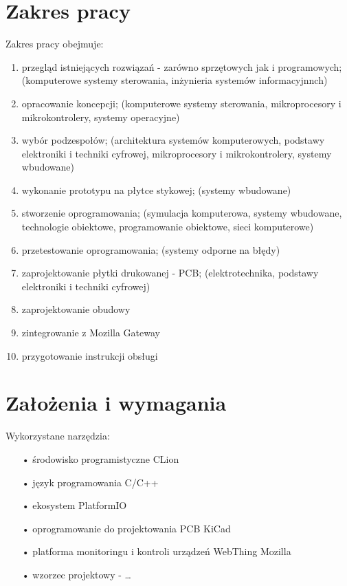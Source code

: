 \documentclass[12pt]{report}
\begin{document}
 \section{Zakres pracy}
 Zakres pracy obejmuje:
 \begin{enumerate}
 \item przegląd istniejących rozwiązań - zarówno sprzętowych jak i programowych; (komputerowe systemy sterowania, inżynieria systemów informacyjnnch)
 \item opracowanie koncepcji; (komputerowe systemy sterowania, mikroprocesory i mikrokontrolery, systemy operacyjne)
 \item wybór podzespołów; (architektura systemów komputerowych, podstawy elektroniki i techniki cyfrowej, mikroprocesory i mikrokontrolery, systemy wbudowane)
 \item wykonanie prototypu na płytce stykowej; (systemy wbudowane)
 \item stworzenie oprogramowania; (symulacja komputerowa, systemy wbudowane, technologie obiektowe, programowanie obiektowe, sieci komputerowe)
 \item przetestowanie oprogramowania; (systemy odporne na błędy)
 \item zaprojektowanie płytki drukowanej - PCB; (elektrotechnika, podstawy elektroniki i techniki cyfrowej)
 \item zaprojektowanie obudowy
 \item zintegrowanie z Mozilla Gateway
 \item przygotowanie instrukcji obsługi
 \end{enumerate}
 
 \section{Założenia i wymagania}
 
 Wykorzystane narzędzia:
 \begin{enumerate}
 \item[•] środowisko programistyczne CLion
 \item[•] język programowania C/C++
 \item[•] ekosystem PlatformIO
 \item[•] oprogramowanie do projektowania PCB KiCad
 \item[•] platforma monitoringu i kontroli urządzeń WebThing Mozilla
 \item[•] wzorzec projektowy - \dots
 \end{enumerate}
 
\end{document}
